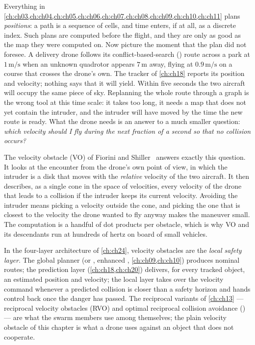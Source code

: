 Everything in \cref{ch:ch03,ch:ch04,ch:ch05,ch:ch06,ch:ch07,ch:ch08,ch:ch09,ch:ch10,ch:ch11} plans
\emph{positions}: a path is a sequence of cells, and time enters, if at all, as
a discrete index. Such plans are computed before the flight, and they are only
as good as the map they were computed on. Now picture the moment that the plan
did not foresee. A delivery drone follows its conflict-based-search (\cbs) route across a park at
$1\,\mathrm{m/s}$ when an unknown quadrotor appears $7\,\mathrm{m}$ away,
flying at $0.9\,\mathrm{m/s}$ on a course that crosses the drone's own. The
tracker of \cref{ch:ch18} reports its position and velocity; nothing says that
it will yield. Within five seconds the two aircraft will occupy the same piece
of sky. Replanning the whole route through a graph is the wrong tool at this
time scale: it takes too long, it needs a map that does not yet contain the
intruder, and the intruder will have moved by the time the new route is
ready. What the drone needs is an answer to a much smaller question:
\emph{which velocity should I fly during the next fraction of a second so
that no collision occurs?}

The velocity obstacle (VO) of Fiorini and Shiller~\cite{fiorini1998motion}
answers exactly this question. It looks at the encounter from the drone's own
point of view, in which the intruder is a disk that moves with the
\emph{relative} velocity of the two aircraft. It then describes, as a single
cone in the space of velocities, every velocity of the drone that leads to a
collision if the intruder keeps its current velocity. Avoiding the intruder
means picking a velocity outside the cone, and picking the one that is closest
to the velocity the drone wanted to fly anyway makes the maneuver small. The
computation is a handful of dot products per obstacle, which is why VO and its
descendants run at hundreds of hertz on board of small vehicles.

In the four-layer architecture of \cref{ch:ch24}, velocity obstacles are the
\emph{local safety layer}. The global planner (\cbs or \ecbs, enhanced
\cbs, \cref{ch:ch09,ch:ch10}) produces nominal routes; the prediction layer
(\cref{ch:ch18,ch:ch20}) delivers, for every tracked object, an estimated
position and velocity; the local layer takes over the velocity command whenever
a predicted collision is closer than a safety horizon and hands control back
once the danger has passed. The reciprocal variants of \cref{ch:ch13} ---
reciprocal velocity obstacles (RVO) and optimal reciprocal collision avoidance
(\orca) --- are what the swarm members use among themselves; the plain velocity
obstacle of this chapter is what a drone uses against an object that does not
cooperate.


